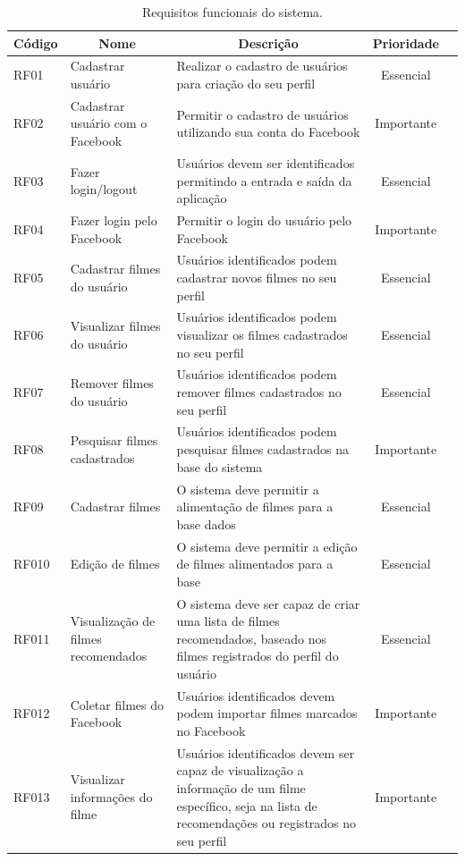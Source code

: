 \begin{table}[H]
	\centering
	\caption{Requisitos funcionais do sistema.}
	\label{tab:req-funcionais}
	\def\arraystretch{1.2} %
	\begin{tabular}{|m{1.2cm} | m{3cm} | m{7.2cm}| c | m{1.9cm}}
		\hline
		\multicolumn{1}{|c|}{\bfseries Código} & \multicolumn{1}{c|}{\bfseries Nome} & \multicolumn{1}{c|}{\bfseries Descrição} & \multicolumn{1}{c|}{\bfseries Prioridade} \\ \hline
		RF01	& Cadastrar usuário	& Realizar o cadastro de usuários para criação do seu perfil	& Essencial \\ \hline
		RF02	& Cadastrar usuário com o Facebook	& Permitir o cadastro de usuários utilizando sua conta do Facebook	& Importante \\ \hline
		RF03	& Fazer login/logout	& Usuários devem ser identificados permitindo a entrada e saída da aplicação	& Essencial \\ \hline
		RF04	& Fazer login pelo Facebook	& Permitir o login do usuário pelo Facebook	& Importante \\ \hline
		RF05	& Cadastrar filmes do usuário	& Usuários identificados podem cadastrar novos filmes no seu perfil	& Essencial \\ \hline
		RF06	& Visualizar filmes do usuário	& Usuários identificados podem visualizar os filmes cadastrados no seu perfil	& Essencial \\ \hline
		RF07	& Remover filmes do usuário	& Usuários identificados podem remover filmes cadastrados no seu perfil	& Essencial \\ \hline
		RF08	& Pesquisar filmes cadastrados	& Usuários identificados podem pesquisar filmes cadastrados na base do sistema	& Importante \\ \hline
		RF09	& Cadastrar filmes	& O sistema deve permitir a alimentação de filmes para a base dados	& Essencial \\ \hline
		RF010	& Edição de filmes	& O sistema deve permitir a edição de filmes alimentados para a base	& Essencial \\ \hline
		RF011	& Visualização de filmes recomendados	& O sistema deve ser capaz de criar uma lista de filmes recomendados, baseado nos filmes registrados do perfil do usuário	& Essencial \\ \hline
		RF012	& Coletar filmes do Facebook	& Usuários identificados devem podem importar filmes marcados no Facebook	& Importante \\ \hline
		RF013	& Visualizar informações do filme	& Usuários identificados devem ser capaz de visualização a informação de um filme específico, seja na lista de recomendações ou registrados no seu perfil	& Importante \\ \hline
	\end{tabular}
\end{table}

